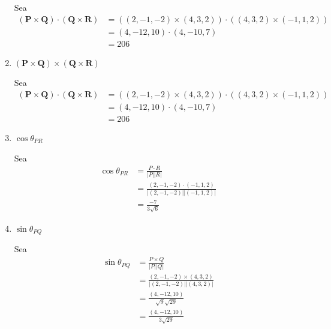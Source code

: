 \begin{problema}
\begin{enumerate}
\begin{sol}
        Sea 
        \begin{align*}
            (\mathbf{P} \times \mathbf{Q}) \cdot(\mathbf{Q} \times \mathbf{R}) &= ((2,-1,-2)\times (4,3,2)) \cdot((4,3,2)\times (-1,1,2))\\
            &= (4,-12,10) \cdot(4,-10,7)\\
            &= 206
        \end{align*}
    \end{sol}
    \item $(\mathbf{P} \times \mathbf{Q}) \times(\mathbf{Q} \times \mathbf{R})$
    \begin{sol}
        Sea 
        \begin{align*}
            (\mathbf{P} \times \mathbf{Q}) \cdot(\mathbf{Q} \times \mathbf{R}) &= ((2,-1,-2)\times (4,3,2)) \cdot((4,3,2)\times (-1,1,2))\\
            &= (4,-12,10) \cdot(4,-10,7)\\
            &= 206
        \end{align*}
    \end{sol}
    \item $\cos \theta_{P R}$
    \begin{sol}
        Sea 
        \begin{align*}
            \cos \theta_{P R} &= \frac{P\cdot R}{|P||R|}\\
            &= \frac{ (2,-1,-2)\cdot (-1,1,2)}{| (2,-1,-2)||(-1,1,2)|}\\
            &= \frac{-7}{3\sqrt{6}}
        \end{align*}
    \end{sol}
    \item $\sin \theta_{P Q}$
    \begin{sol}
        Sea 
        \begin{align*}
            \sin \theta_{P Q} &= \frac{P\times Q}{|P||Q|}\\
            &= \frac{ (2,-1,-2)\times (4,3,2)}{| (2,-1,-2)||(4,3,2)|}\\
            &=\frac{(4,-12,10)}{\sqrt{9}\sqrt{29}}\\
            &=\frac{(4,-12,10)}{3\sqrt{29}}
        \end{align*}
    \end{sol}
\end{enumerate}


\end{problema}

